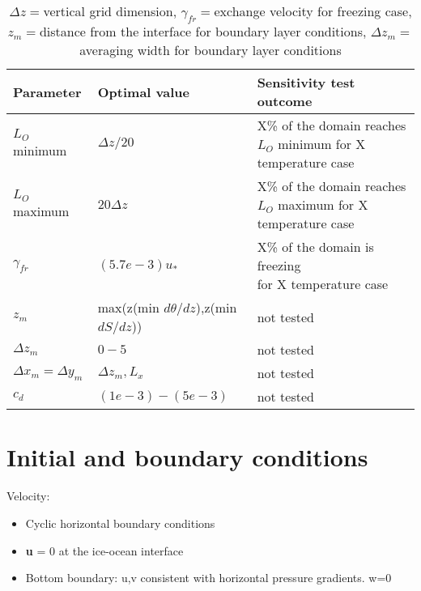 \documentclass[letterpaper,10pt]{report}
\begin{document}
	\begin{table}[htbp]%
	\caption{$\Delta z = $vertical grid dimension, $\gamma_{fr} = $exchange velocity for freezing case, $z_m = $distance from the interface for boundary layer conditions, $\Delta z_m = $averaging width for boundary layer conditions}
	\label{table:most_prm}
    \centering
    \begin{tabular}{|l|l|l|}
	\hline
	Parameter & Optimal value & Sensitivity test outcome\\
	\hline
	$L_O$ minimum & $\Delta z/20$ & \makecell[l]{X\% of the domain reaches $L_O$ minimum \\ for X temperature case} \\ \hline
	$L_O$ maximum & $20\Delta z$ & \makecell[l]{X\% of the domain reaches $L_O$ maximum \\ for X temperature case}\\ \hline
    $\gamma_{fr}$ & $(5.7e-3) u_*$ & \makecell[l]{X\% of the domain is freezing \\ for X temperature case}\\ \hline
    $z_m$ & max(z(min $d\theta/dz$),z(min $dS/dz$)) & not tested\\ \hline %
    $\Delta z_m$ & $0 - 5$ & not tested\\ \hline
    $\Delta x_m = \Delta y_m$ & $\Delta z_m, L_x$ & not tested\\ \hline
	$c_d$ & $(1e-3) - (5e-3)$ & not tested\\ \hline
    \end{tabular}
	\end{table}
	
	\newpage
	\section{Initial and boundary conditions}
	
	Velocity:
	\begin{itemize}
	\item Cyclic horizontal boundary conditions
	\item \textbf{u} = 0 at the ice-ocean interface
	\item Bottom boundary: u,v consistent with horizontal pressure gradients. w=0
	\end{itemize}
	
\end{document}
